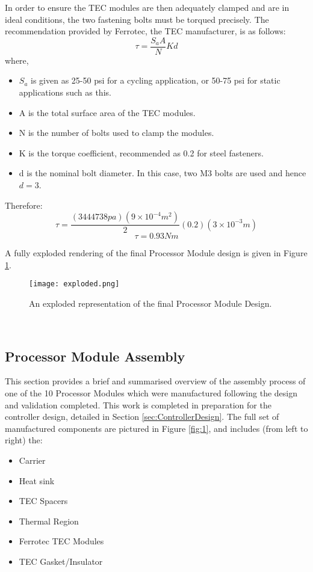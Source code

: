 In order to ensure the TEC modules are then adequately clamped and are in ideal conditions, the two fastening bolts must be torqued precisely. The recommendation provided by Ferrotec, the TEC manufacturer, is as follows:
\begin{equation}
\tau = \frac{S_a A}{N}Kd
\end{equation}
where,
\begin{itemize}
	\item $S_a$ is given as 25-50 psi for a cycling application, or 50-75 psi for static applications such as this.
	\item A is the total surface area of the TEC modules.
	\item N is the number of bolts used to clamp the modules.
	\item K is the torque coefficient, recommended as 0.2 for steel fasteners.
	\item d is the nominal bolt diameter. In this case, two M3 bolts are used and hence $d=3$.
\end{itemize}
Therefore:
$$\tau = \frac{(3444738 pa)(9\times 10^{-4}m^2)}{2}(0.2)(3\times10^{-3}m)$$
$$\tau = 0.93 Nm$$

A fully exploded rendering of the final Processor Module design is given in Figure \ref{fig:exploded}.

\begin{figure}[!htb]
	\centering
	\texttt{[image: exploded.png]}
	\caption[Processor Module Exploded Rendering.]{An exploded representation of the final Processor Module Design.}
	\label{fig:exploded}
\end{figure} 
\FloatBarrier

\subsection{Processor Module Assembly}

This section provides a brief and summarised overview of the assembly process of one of the 10 Processor Modules which were manufactured following the design and validation completed. This work is completed in preparation for the controller design, detailed in Section \ref{sec:ControllerDesign}. The full set of manufactured components are pictured in Figure \ref{fig:1}, and includes (from left to right) the:
\begin{itemize}
	\item Carrier
	\item Heat sink
	\item TEC Spacers
	\item Thermal Region
	\item Ferrotec TEC Modules
	\item TEC Gasket/Insulator
\end{itemize}

